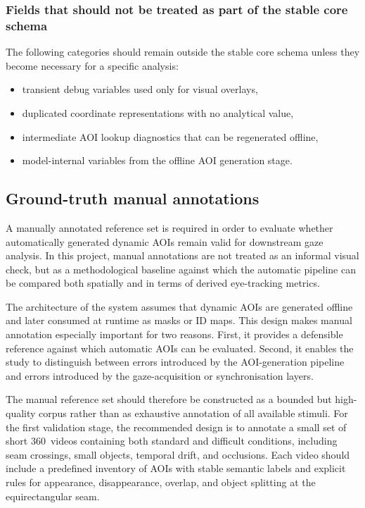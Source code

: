 \documentclass[11pt]{article}
\begin{document}
\subsubsection{Fields that should not be treated as part of the stable core schema}

The following categories should remain outside the stable core schema unless they become necessary for a specific analysis:

\begin{itemize}
    \item transient debug variables used only for visual overlays,
    \item duplicated coordinate representations with no analytical value,
    \item intermediate AOI lookup diagnostics that can be regenerated offline,
    \item model-internal variables from the offline AOI generation stage.
\end{itemize}



\subsection{Ground-truth manual annotations}

A manually annotated reference set is required in order to evaluate whether automatically generated dynamic AOIs remain valid for downstream gaze analysis. In this project, manual annotations are not treated as an informal visual check, but as a methodological baseline against which the automatic pipeline can be compared both spatially and in terms of derived eye-tracking metrics.

The architecture of the system assumes that dynamic AOIs are generated offline and later consumed at runtime as masks or ID maps. This design makes manual annotation especially important for two reasons. First, it provides a defensible reference against which automatic AOIs can be evaluated. Second, it enables the study to distinguish between errors introduced by the AOI-generation pipeline and errors introduced by the gaze-acquisition or synchronisation layers.

The manual reference set should therefore be constructed as a bounded but high-quality corpus rather than as exhaustive annotation of all available stimuli. For the first validation stage, the recommended design is to annotate a small set of short 360\textdegree\ videos containing both standard and difficult conditions, including seam crossings, small objects, temporal drift, and occlusions. Each video should include a predefined inventory of AOIs with stable semantic labels and explicit rules for appearance, disappearance, overlap, and object splitting at the equirectangular seam.
\end{document}
